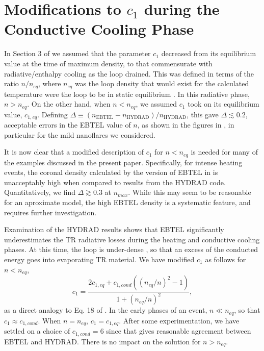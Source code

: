 \documentclass[iop]{emulateapj}
\begin{document}
	\section{Modifications to $c_1$ during the Conductive Cooling Phase}
	\label{appendix_c1_corrections}
	\par In Section 3 of \citet{cargill_enthalpy-based_2012} we assumed that the parameter $c_1$ decreased from its equilibrium value at the time of maximum density, to that commensurate with radiative/enthalpy cooling as the loop drained. This was defined in terms of the ratio $n/n_{eq}$, where $n_{eq}$ was the loop density that would exist for the calculated temperature were the loop to be in static equilibrium \citep[Equation 17 of][]{cargill_enthalpy-based_2012}. In this radiative phase, $n > n_{eq}$. On the other hand, when $n < n_{eq}$, we assumed $c_1$ took on its equilibrium value, $c_{1,eq}$. Defining $\Delta\equiv(n_{\mathrm{EBTEL}} - n_{\mathrm{HYDRAD}})/n_{\mathrm{HYDRAD}}$, this gave $\Delta\lesssim0.2$, acceptable errors in the EBTEL value of $n$, as shown in the figures in \citet{cargill_enthalpy-based_2012}, in particular for the mild nanoflares we considered.
	\par It is now clear that a modified description of $c_1$ for $n < n_{eq}$ is needed for many of the examples discussed in the present paper. Specifically, for intense heating events, the coronal density calculated by the version of EBTEL in \citet{cargill_enthalpy-based_2012} is unacceptably high when compared to results from the HYDRAD code. Quantitatively, we find $\Delta\gtrsim0.3$ at $n_{max}$. While this may seem to be reasonable for an aproximate model, the high EBTEL density is a systematic feature, and requires further investigation.
	\par Examination of the HYDRAD results shows that EBTEL significantly underestimates the TR radiative losses during the heating and conductive cooling phases. At this time, the loop is under-dense \citep[e.g.][]{cargill_nanoflare_2004}, so that an excess of the conducted energy goes into evaporating TR material. We have modified $c_1$ as follows for $n < n_{eq}$,
	\begin{equation}
		c_1 = \frac{2c_{1,eq} + c_{1,cond}((n_{eq}/n)^2-1)}{1+(n_{eq}/n)^2},
		\label{eq:c1_mod}
	\end{equation}
	as a direct analogy to Eq. 18 of \citet{cargill_enthalpy-based_2012}. In the early phases of an event, $n \ll n_{eq}$, so that $c_1 \approx c_{1,cond}$. When $n = n_{eq}$, $c_1 = c_{1,eq}$. After some experimentation, we have settled on a choice of $c_{1,cond} = 6$ since that gives reasonable agreement between EBTEL and HYDRAD. There is no impact on the solution for $n > n_{eq}$. 
\end{document}
